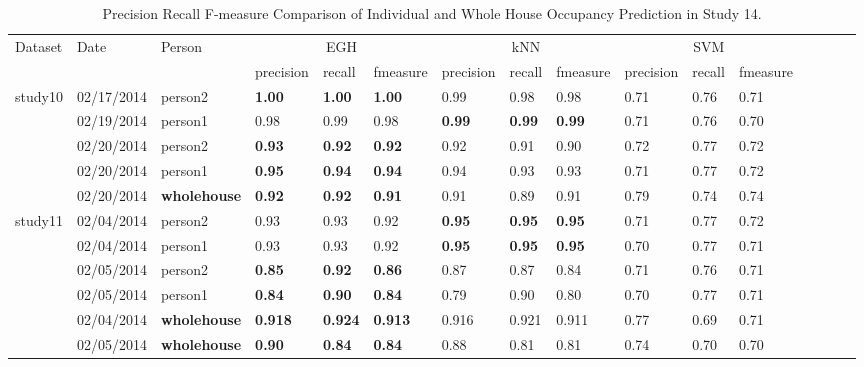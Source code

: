 \begin{table*}[t]
\hfill

\caption{Precision Recall F-measure Comparison of Individual and Whole House Occupancy Prediction in Study 14.}
\label{tab_individualResults}
\centering
\small
\setlength\tabcolsep{2pt}
\begin{tabular} {|l|l|l|l|l|l|l|l|l|l|l|l|l|l|l|l|}
\hline
\multirow{2}{*}{Dataset}&\multirow{2}{*}{Date}&\multirow{2}{*}{Person} & \multicolumn{3}{|c|}{EGH}&\multicolumn{3}{|c|}{kNN} &\multicolumn{3}{|c|}{SVM}   \\
\cline{4-12}
&&& precision & recall &fmeasure &precision & recall & fmeasure &precision & recall & fmeasure \\
\hline
\multirow{3}{*}{study10}  & 02/17/2014 & person2& \textbf{1.00} & \textbf{1.00}&\textbf{1.00} & 0.99 & 0.98 & 0.98 &0.71 &0.76 & 0.71\\
\cline{2-12}
& 02/19/2014 & person1& 0.98 & 0.99 &0.98&  \textbf{0.99} &  \textbf{0.99} &  \textbf{0.99} & 0.71 & 0.76 & 0.70 \\
\cline{2-12}
& 02/20/2014 & person2&  \textbf{0.93} &  \textbf{0.92} &  \textbf{0.92} & 0.92 & 0.91 & 0.90 & 0.72 & 0.77 & 0.72\\
\cline{2-12}
& 02/20/2014 & person1&  \textbf{0.95}& \textbf{0.94} & \textbf{0.94} & 0.94	& 0.93 & 0.93 & 0.71 & 0.77 & 0.72 \\
\cline{2-12}
& 02/20/2014 & \textbf{wholehouse}&  \textbf{0.92}& \textbf{0.92} & \textbf{0.91} & 0.91	& 0.89 & 0.91 & 0.79 & 0.74 & 0.74 \\
\hline
\hline
\multirow{3}{*}{study11}  & 02/04/2014 & person2& 0.93 & 0.93 & 0.92  & \textbf{0.95} & \textbf{0.95} & \textbf{0.95} & 0.71 & 0.77 &0.72\\
\cline{2-12}
& 02/04/2014 & person1& 0.93 & 0.93 & 0.92  & \textbf{0.95} & \textbf{0.95} & \textbf{0.95} & 0.70 & 0.77 & 0.71  \\
\cline{2-12}
& 02/05/2014 & person2&  \textbf{0.85} &  \textbf{0.92} &  \textbf{0.86} & 0.87 & 0.87 & 0.84 & 0.71 & 0.76 & 0.71 \\
\cline{2-12}
& 02/05/2014 & person1&  \textbf{0.84} &  \textbf{0.90} &  \textbf{0.84} & 0.79 & 0.90 & 0.80  & 0.70 & 0.77 & 0.71   \\
\cline{2-12}
& 02/04/2014 & \textbf{wholehouse}&  \textbf{0.918}& \textbf{0.924} & \textbf{0.913} & 0.916	& 0.921 & 0.911 & 0.77 & 0.69 & 0.71  \\
\cline{2-12}
& 02/05/2014 & \textbf{wholehouse}&  \textbf{0.90}& \textbf{0.84} & \textbf{0.84} & 0.88	& 0.81 & 0.81 & 0.74 & 0.70 & 0.70\\
\hline
\end{tabular}
\end{table*}